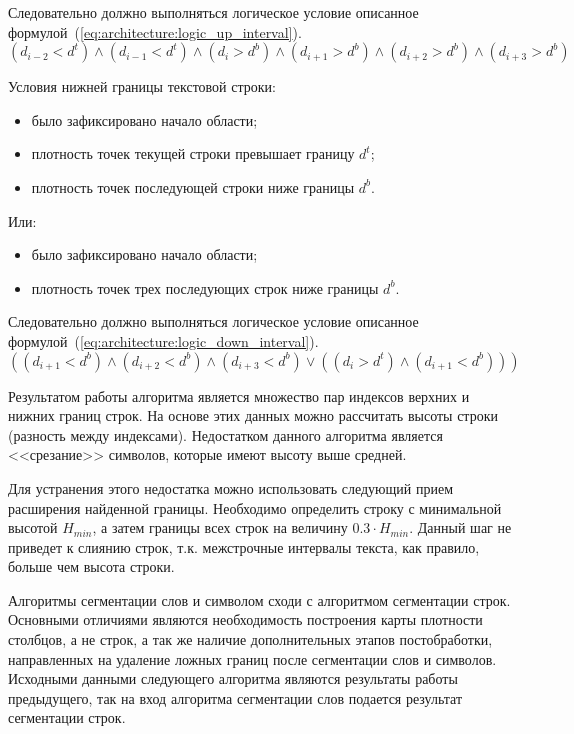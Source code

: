 Следовательно должно выполняться логическое условие описанное формулой~(\ref{eq:architecture:logic_up_interval}).
\begin{equation}
  \label{eq:architecture:logic_up_interval}
  (d_{i-2} < d^{t}) \wedge (d_{i-1} < d^{t}) \wedge (d_i > d^{b}) \wedge (d_{i+1} > d^{b}) \wedge (d_{i+2} > d^{b}) \wedge (d_{i+3} > d^{b})
\end{equation}

Условия нижней границы текстовой строки:
\begin{itemize}     
  \item было зафиксировано начало области;
  \item плотность точек текущей строки превышает границу $ d^{t} $;
  \item плотность точек последующей строки ниже границы $ d^{b} $.
\end{itemize}
     
Или:

\begin{itemize}
   \item было зафиксировано начало области;
   \item плотность точек трех последующих строк ниже границы $ d^{b} $.
\end{itemize}

Следовательно должно выполняться логическое условие описанное формулой~(\ref{eq:architecture:logic_down_interval}).
\begin{equation}
  \label{eq:architecture:logic_down_interval}
  ((d_{i+1} < d^{b}) \wedge (d_{i+2} < d^{b}) \wedge (d_{i+3} < d^{b}) \vee ((d_i > d^{t}) \wedge (d_{i+1} < d^{b})))
\end{equation}

Результатом работы алгоритма является множество пар индексов верхних и нижних границ строк. На основе этих данных можно рассчитать высоты строки (разность между индексами). Недостатком данного алгоритма является <<срезание>> символов, которые имеют высоту выше средней.

Для устранения этого недостатка можно использовать следующий прием расширения найденной границы. Необходимо определить строку с минимальной высотой $ H_{min} $, а затем границы всех строк на величину $ 0.3 \cdot  H_{min} $. Данный шаг не приведет к слиянию строк, т.к. межстрочные интервалы текста, как правило, больше чем высота строки.
 
Алгоритмы сегментации слов и символом сходи с алгоритмом сегментации строк. Основными отличиями являются необходимость построения карты плотности столбцов, а не строк, а так же наличие дополнительных этапов постобработки, направленных на удаление ложных границ после сегментации слов и символов. Исходными данными следующего алгоритма являются результаты работы предыдущего, так на вход алгоритма сегментации слов подается результат сегментации строк.

